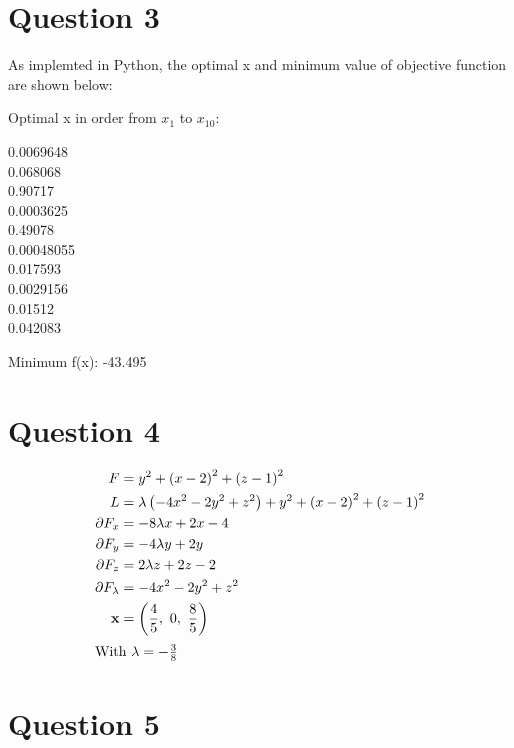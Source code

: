 \documentclass[a4paper,12pt]{article} %
\begin{document}
\section*{\textbf{Question 3}}
As implemted in Python, the optimal x and minimum value of objective function are shown below:

Optimal x in order from $x_1$ to $x_{10}$: 

0.0069648 \\
0.068068\\
0.90717\\
0.0003625\\
0.49078\\
0.00048055\\
0.017593\\
0.0029156\\
0.01512\\
0.042083

Minimum f(x): -43.495
\newpage
\section*{\textbf{Question 4}}
\begin{align*}
    F &= y^{2} + \left(x - 2\right)^{2} + \left(z - 1\right)^{2} \\
    L &= \lambda \left(- 4 x^{2} - 2 y^{2} + z^{2}\right) + y^{2} + \left(x - 2\right)^{2} + \left(z - 1\right)^{2} \\
    \partial F_{x} &= - 8 \lambda x + 2 x - 4 \\
    \partial F_{y} &= - 4 \lambda y + 2 y \\
    \partial F_{z} &= 2 \lambda z + 2 z - 2 \\
    \partial F_{\lambda} &= - 4 x^{2} - 2 y^{2} + z^{2} \\
    \mathbf{x} &=   \left( \frac{4}{5}, \  0, \  \frac{8}{5}\right) \\
    \intertext{With $\lambda = - \frac{3}{8}$}
\end{align*}
\newpage
\section*{\textbf{Question 5}}
\end{document}
